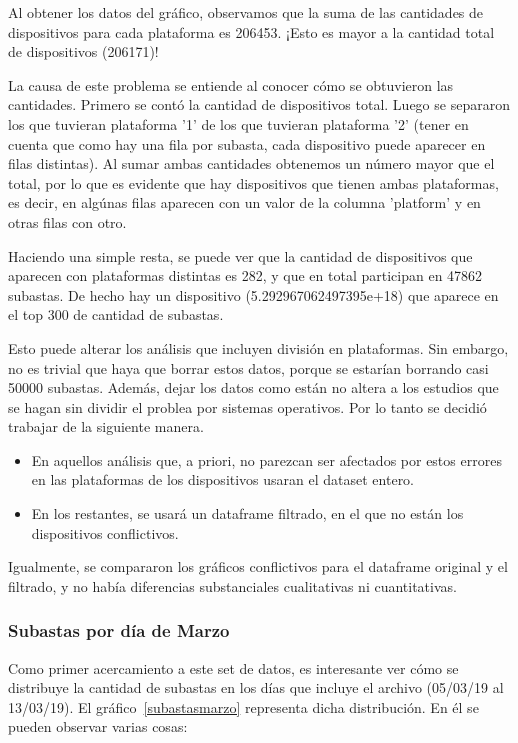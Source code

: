 \documentclass[a4paper, 12pt]{article}
\begin{document}
	 Al obtener los datos del gráfico, observamos que la suma de las cantidades de dispositivos para cada plataforma es 206453. ¡Esto es mayor a la cantidad total de dispositivos (206171)!
	 
	 
	 La causa de este problema se entiende al conocer cómo se obtuvieron las cantidades. Primero se contó la cantidad de dispositivos total. Luego se separaron los que tuvieran plataforma '1' de los que tuvieran plataforma '2' (tener en cuenta que como hay una fila por subasta, cada dispositivo puede aparecer en filas distintas). Al sumar ambas cantidades obtenemos un número mayor que el total, por lo que es evidente que hay dispositivos que tienen ambas plataformas, es decir, en algúnas filas aparecen con un valor de la columna 'platform' y en otras filas con otro.

	 Haciendo una simple resta, se puede ver que la cantidad de dispositivos que aparecen con plataformas distintas es 282, y que en total participan en 47862 subastas. De hecho hay un dispositivo (5.292967062497395e+18) que aparece en el top 300 de cantidad de subastas.

	 Esto puede alterar los análisis que incluyen división en plataformas. Sin embargo, no es trivial que haya que borrar estos datos, porque se estarían borrando casi 50000 subastas. Además, dejar los datos como están no altera a los estudios que se hagan sin dividir el problea por sistemas operativos. Por lo tanto se decidió trabajar de la siguiente manera.
	 
	\begin{itemize}
		\item En aquellos análisis que, a priori, no parezcan ser afectados por estos errores en las plataformas de los dispositivos usaran el dataset entero.
		\item En los restantes, se usará un dataframe filtrado, en el que no están los dispositivos conflictivos.
	\end{itemize}
	
	 Igualmente, se compararon los gráficos conflictivos para el dataframe original y el filtrado, y no había diferencias substanciales cualitativas ni cuantitativas.
	
	
	\subsubsection{Subastas por día de Marzo}
	 Como primer acercamiento a este set de datos, es interesante ver cómo se distribuye la cantidad de subastas en los días que incluye el archivo (05/03/19 al 13/03/19).
	 El gráfico~\ref{subastasmarzo} representa dicha distribución. En él se pueden observar varias cosas:
\end{document}
